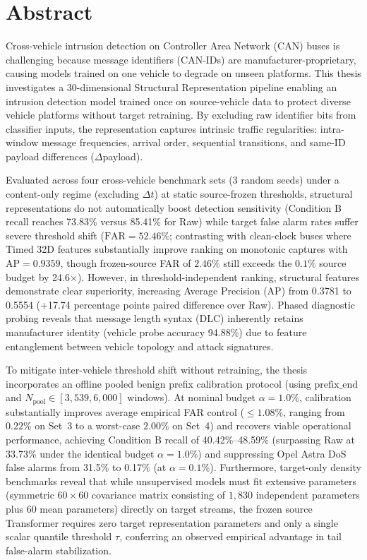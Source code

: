 \documentclass[12pt, a4paper, reqno, oneside]{book}
\newcommand\chap[1]{%
  \clearpage\phantomsection%
  \chapter*{#1}%
  \addcontentsline{toc}{chapter}{#1}%
  \markboth{#1}{}%
}
\begin{document}
\newpage

\chap{Abstract}
\vspace{4pt}

Cross-vehicle intrusion detection on Controller Area Network (CAN) buses is challenging because message identifiers (CAN-IDs) are manufacturer-proprietary, causing models trained on one vehicle to degrade on unseen platforms. This thesis investigates a 30-dimensional Structural Representation pipeline enabling an intrusion detection model trained once on source-vehicle data to protect diverse vehicle platforms without target retraining. By excluding raw identifier bits from classifier inputs, the representation captures intrinsic traffic regularities: intra-window message frequencies, arrival order, sequential transitions, and same-ID payload differences ($\Delta$payload).

Evaluated across four cross-vehicle benchmark sets (3 random seeds) under a content-only regime (excluding $\Delta t$) at static source-frozen thresholds, structural representations do not automatically boost detection sensitivity (Condition B recall reaches 73.83\% versus 85.41\% for Raw) while target false alarm rates suffer severe threshold shift ($\text{FAR} = 52.46\%$; contrasting with clean-clock buses where Timed 32D features substantially improve ranking on monotonic captures with $\text{AP} = 0.9359$, though frozen-source FAR of $2.46\%$ still exceeds the $0.1\%$ source budget by 24.6$\times$). However, in threshold-independent ranking, structural features demonstrate clear superiority, increasing Average Precision (AP) from 0.3781 to 0.5554 (+17.74 percentage points paired difference over Raw). Phased diagnostic probing reveals that message length syntax (DLC) inherently retains manufacturer identity (vehicle probe accuracy 94.88\%) due to feature entanglement between vehicle topology and attack signatures.

To mitigate inter-vehicle threshold shift without retraining, the thesis incorporates an offline pooled benign prefix calibration protocol (using $\mathrm{prefix\_end}$ and $N_{\text{pool}} \in [3{,}539, 6{,}000]$ windows). At nominal budget $\alpha = 1.0\%$, calibration substantially improves average empirical FAR control ($\le 1.08\%$, ranging from $0.22\%$ on Set~3 to a worst-case $2.00\%$ on Set~4) and recovers viable operational performance, achieving Condition B recall of 40.42\%--48.59\% (surpassing Raw at 33.73\% under the identical budget $\alpha = 1.0\%$) and suppressing Opel Astra DoS false alarms from 31.5\% to 0.17\% (at $\alpha = 0.1\%$). Furthermore, target-only density benchmarks reveal that while unsupervised models must fit extensive parameters (symmetric $60\times 60$ covariance matrix consisting of $1{,}830$ independent parameters plus $60$ mean parameters) directly on target streams, the frozen source Transformer requires zero target representation parameters and only a single scalar quantile threshold $\tau$, conferring an observed empirical advantage in tail false-alarm stabilization.
\end{document}
